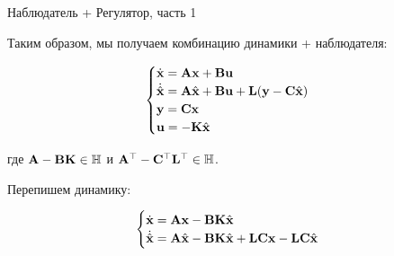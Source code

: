 \documentclass{beamer}
\begin{document}
\begin{frame}{Наблюдатель + Регулятор, часть 1}
	\begin{flushleft}
		
		Таким образом, мы получаем комбинацию динамики + наблюдателя:
		
		\begin{equation}
			\begin{cases}
				\dot {\mathbf{x}} = \mathbf{A} \mathbf{x} + \mathbf{B} \mathbf{u} \\
				\dot{\hat{\mathbf{x}}} = \mathbf{A} \hat{\mathbf{x}} + \mathbf{B} \mathbf u + \mathbf{L}(\mathbf y - \mathbf{C} \hat{\mathbf{x}})\\
				\mathbf{y} = \mathbf{C} \mathbf{x} \\
				\mathbf{u} = -\mathbf{K} \hat{\mathbf{x}}
			\end{cases}
		\end{equation}
		
		\bigskip
		
		где $\mathbf{A} - \mathbf{B} \mathbf{K} \in \mathbb{H}$ и $\mathbf{A}^{\top} - 
		\mathbf{C}^{\top} \mathbf{L}^{\top} \in \mathbb{H}$.
		
		Перепишем динамику:
		
		\begin{equation}
			\begin{cases}
				\dot {\mathbf{x}} =\mathbf{A} \mathbf{x} - \mathbf{B} \mathbf{K} \hat{\mathbf{x}} 
				\\
				\dot{\hat{\mathbf{x}}} = \mathbf{A} \hat{\mathbf{x}} - \mathbf{B} \mathbf{K}\hat{\mathbf{x}} +\mathbf{L}\mathbf{C} \mathbf{x} - \mathbf{L}\mathbf{C} \hat{\mathbf{x}}
			\end{cases}
		\end{equation}
		
	\end{flushleft}
\end{frame}
\end{document}
